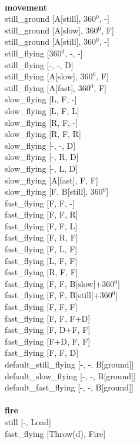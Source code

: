 \ \\ {\bf movement } \\
still_ground [A[still], 360$^0$, -] \\
still_ground [A[slow], 360$^0$, F] \\
still_ground [A[still], 360$^0$, -] \\
still_flying [360$^0$, -, -] \\
still_flying [-, -, D] \\
still_flying [A[slow], 360$^0$, F] \\
still_flying [A[fast], 360$^0$, F] \\
slow_flying [L, F, -] \\
slow_flying [L, F, L] \\
slow_flying [R, F, -] \\
slow_flying [R, F, R] \\
slow_flying [-, -, D] \\
slow_flying [-, R, D] \\
slow_flying [-, L, D] \\
slow_flying [A[fast], F, F] \\
slow_flying [F, B[still], 360$^0$] \\
fast_flying [F, F, -] \\
fast_flying [F, F, R] \\
fast_flying [F, F, L] \\
fast_flying [F, R, F] \\
fast_flying [F, L, F] \\
fast_flying [L, F, F] \\
fast_flying [R, F, F] \\
fast_flying [F, F, B[slow]+360$^0$] \\
fast_flying [F, F, B[still]+360$^0$] \\
fast_flying [F, F, F] \\
fast_flying [F, F, F+D] \\
fast_flying [F, D+F, F] \\
fast_flying [F+D, F, F] \\
fast_flying [F, F, D] \\
default_still_flying [-, -, B[ground]] \\
default_slow_flying [-, -, B[ground]] \\
default_fast_flying [-, -, B[ground]] \\
\ \\ {\bf fire } \\
still [-, Load] \\
fast_flying [Throw(d), Fire] \\
